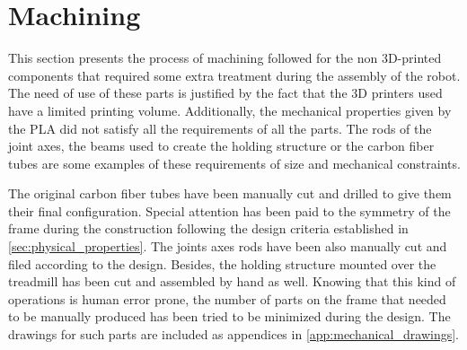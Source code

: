 \section{Machining} %
\label{sec:machining}
This section presents the process of machining followed for the non 3D-printed components that required some extra treatment during the assembly of the robot.
The need of use of these parts is justified by the fact that the 3D printers used have a limited printing volume.
Additionally, the mechanical properties given by the PLA did not satisfy all the requirements of all the parts.
The rods of the joint axes, the beams used to create the holding structure or the carbon fiber tubes are some examples of these requirements of size and mechanical constraints.

The original carbon fiber tubes have been manually cut and drilled to give them their final configuration.
Special attention has been paid to the symmetry of the frame during the construction following the design criteria established in \ref{sec:physical_properties}.
The joints axes rods have been also manually cut and filed according to the design.
Besides, the holding structure mounted over the treadmill has been cut and assembled by hand as well.
Knowing that this kind of operations is human error prone, the number of parts on the frame that needed to be manually produced has been tried to be minimized during the design.
The drawings for such parts are included as appendices in \ref{app:mechanical_drawings}.

